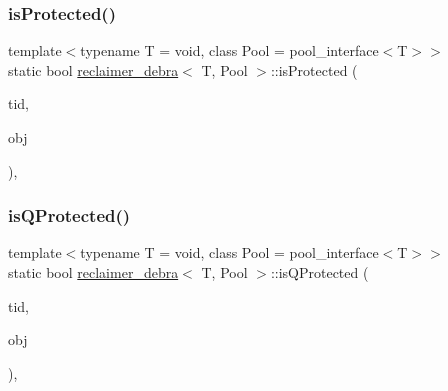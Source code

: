 \mbox{\label{classreclaimer__debra_ad2d948e24b18e93187576c00d0f5ce4d}} 
\subsubsection{\texorpdfstring{is\+Protected()}{isProtected()}}
{\footnotesize\ttfamily template$<$typename T  = void, class Pool  = pool\+\_\+interface$<$\+T$>$$>$ \\
static bool \hyperlink{classreclaimer__debra}{reclaimer\+\_\+debra}$<$ T, Pool $>$\+::is\+Protected (\begin{DoxyParamCaption}\item[{const int}]{tid,  }\item[{T $\ast$const}]{obj }\end{DoxyParamCaption})\hspace{0.3cm}{\ttfamily [inline]}, {\ttfamily [static]}}

\mbox{\label{classreclaimer__debra_a318c2e48b9fd638b37a3faaa2bdec334}} 
\subsubsection{\texorpdfstring{is\+Q\+Protected()}{isQProtected()}}
{\footnotesize\ttfamily template$<$typename T  = void, class Pool  = pool\+\_\+interface$<$\+T$>$$>$ \\
static bool \hyperlink{classreclaimer__debra}{reclaimer\+\_\+debra}$<$ T, Pool $>$\+::is\+Q\+Protected (\begin{DoxyParamCaption}\item[{const int}]{tid,  }\item[{T $\ast$const}]{obj }\end{DoxyParamCaption})\hspace{0.3cm}{\ttfamily [inline]}, {\ttfamily [static]}}

\mbox{\label{classreclaimer__debra_a687fe55221cbbd2b19210b24839e77ca}} 
